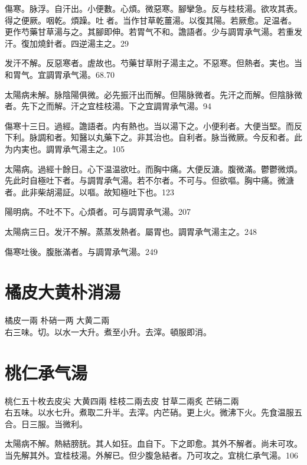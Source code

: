 傷寒。脉浮。自汗出。小便數。心煩。微惡寒。腳攣急。反与桂枝湯。欲攻其表。得之便厥。咽乾。煩躁。吐{\sungii 𠱘}者。当作甘草乾薑湯。以復其陽。若厥愈。足温者。更作芍藥甘草湯与之。其腳即伸。若胃气不和。譫語者。少与{\khaai 調胃}承气湯。若重发汗。復加燒針者。四逆湯主之。29

发汗不解。反惡寒者。虗故也。芍藥甘草附子湯主之。不惡寒。但熱者。実也。当和胃气。宜調胃承气湯。68.70

太陽病未解。脉陰陽俱微。必先振汗出而解。但陽{\khaai 脉}微者。先汗之而解。但陰{\khaai 脉}微者。先下之而解。汗之宜桂枝湯。下之宜{\khaai 調胃}承气湯。94

傷寒十三日。過經。譫語者。内有熱也。当以湯下之。小便利者。大便当堅。而反{\khaai 下}利。脉調和者。知醫以丸藥下之。非其治也。自利者。脉当微厥。今反和者。此为内実也。{\khaai 調胃}承气湯主之。105

太陽病。過經十餘日。心下温温欲吐。而胸中痛。大便反溏。腹微滿。鬱鬱微煩。先{\khaai 此}时自極吐下者。与{\khaai 調胃}承气湯。若不尔者。不可与。但欲嘔。胸中痛。微溏者。此非柴胡湯証。以嘔。故知極吐下也。123

陽明病。不吐不下。心煩者。可与{\khaai 調胃}承气湯。207

太陽病三日。发汗不解。蒸蒸发熱者。{\khaai 屬胃也。調胃}承气湯主之。248

傷寒吐後。腹胀滿者。与{\khaai 調胃}承气湯。249

\section{橘皮大黄朴消湯}

橘皮{\scriptsize 一兩} 朴硝{\scriptsize 一两} 大黄{\scriptsize 二兩}\\
右三味。切。以水一大升。煮至小升。去滓。頓服即消。


\section{桃仁承气湯}

桃仁{\scriptsize 五十枚去皮尖} 大黄{\scriptsize 四兩} 桂枝{\scriptsize 二兩去皮} 甘草{\scriptsize 二兩炙} 芒硝{\scriptsize 二兩}\\
右五味。以水七升。煮取二升半。去滓。内芒硝。更上火。微沸下火。先食温服五合。日三服。当微利。

太陽病不解。熱結膀胱。其人如狂。血自下。下之即愈。其外不解者。尚未可攻。当先解其外。{\khaai 宜桂枝湯。}外解已。{\khaai 但}少腹急結者。乃可攻之。宜桃仁承气湯。106

